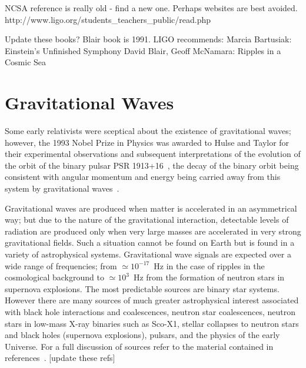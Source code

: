 \documentclass{article}
\begin{document}
NCSA reference is really old - find a new one. Perhaps websites are best avoided.
http://www.ligo.org/students_teachers_public/read.php

Update these books?  Blair book is 1991.  LIGO recommends:
Marcia Bartusiak: Einstein's Unfinished Symphony
David Blair, Geoff McNamara: Ripples in a Cosmic Sea


\newpage

\section{Gravitational Waves}
\label{section:gravwaves}

Some early relativists were sceptical about the existence of gravitational
waves; however, the 1993 Nobel Prize in Physics was awarded to Hulse and Taylor
for their experimental observations and subsequent interpretations of the
evolution of the orbit of the binary pulsar PSR 1913+16~\cite{Hulse, Taylor},
the decay of the binary orbit being consistent with angular momentum and energy
being carried away from this system by gravitational waves~\cite{Will}.

Gravitational waves are produced when matter is accelerated in an asymmetrical
way; but due to the nature of the gravitational interaction, detectable levels
of radiation are produced only when very large masses are accelerated in very
strong gravitational fields. Such a situation cannot be found on Earth but is
found in a variety of astrophysical systems. Gravitational wave signals are
expected over a wide range of frequencies; from $\simeq 10^{-17}$~Hz in the case
of ripples in the cosmological background to $\simeq 10^3$~Hz from the formation
of neutron stars in supernova explosions. The most predictable sources are
binary star systems. However there are many sources of much greater
astrophysical interest associated with black hole interactions and coalescences,
neutron star coalescences, neutron stars in low-mass X-ray binaries such as
Sco-X1, stellar collapses to neutron stars and black holes (supernova
explosions), pulsars, and the physics of the early Universe. For a full
discussion of sources refer to the material contained in
references~\cite{LISAsymposium, sources, Amaldiproc}. [update these refs]
\end{document}
